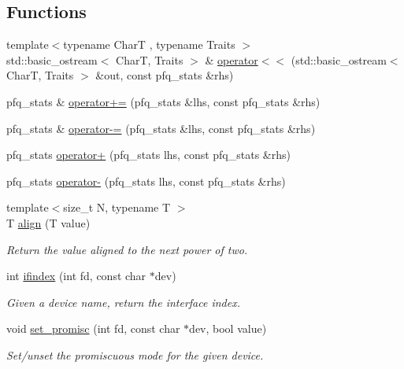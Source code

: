 \subsection*{Functions}
\begin{DoxyCompactItemize}
\item 
{\footnotesize template$<$typename CharT , typename Traits $>$ }\\std\+::basic\+\_\+ostream$<$ CharT, Traits $>$ \& \hyperlink{namespacepfq_a1c2bda68e2e2c718ebd80519034002a3}{operator$<$$<$} (std\+::basic\+\_\+ostream$<$ CharT, Traits $>$ \&out, const pfq\+\_\+stats \&rhs)
\item 
pfq\+\_\+stats \& \hyperlink{namespacepfq_ae140b453ea425ae677dfbc69a51370f8}{operator+=} (pfq\+\_\+stats \&lhs, const pfq\+\_\+stats \&rhs)
\item 
pfq\+\_\+stats \& \hyperlink{namespacepfq_aa7874ca8c38d2bb9b66a33a6c2bb0fc1}{operator-\/=} (pfq\+\_\+stats \&lhs, const pfq\+\_\+stats \&rhs)
\item 
pfq\+\_\+stats \hyperlink{namespacepfq_a1db1dc5635be457a7ca4cd9148ceae19}{operator+} (pfq\+\_\+stats lhs, const pfq\+\_\+stats \&rhs)
\item 
pfq\+\_\+stats \hyperlink{namespacepfq_ad01713142f8fa670ff8614b9f2bab3b8}{operator-\/} (pfq\+\_\+stats lhs, const pfq\+\_\+stats \&rhs)
\item 
{\footnotesize template$<$size\+\_\+t N, typename T $>$ }\\T \hyperlink{namespacepfq_a9db75e7163c5f764248401d10a2a3f9b}{align} (T value)
\begin{DoxyCompactList}\small\item\em Return the value aligned to the next power of two. \end{DoxyCompactList}\item 
int \hyperlink{namespacepfq_a251ac5cc269aa123009754edf62ab8b4}{ifindex} (int fd, const char $\ast$dev)
\begin{DoxyCompactList}\small\item\em Given a device name, return the interface index. \end{DoxyCompactList}\item 
void \hyperlink{namespacepfq_a62b9f1831dc714353f6edcb66a4fad4d}{set\+\_\+promisc} (int fd, const char $\ast$dev, bool value)
\begin{DoxyCompactList}\small\item\em Set/unset the promiscuous mode for the given device. \end{DoxyCompactList}\item 

\end{DoxyCompactItemize}
